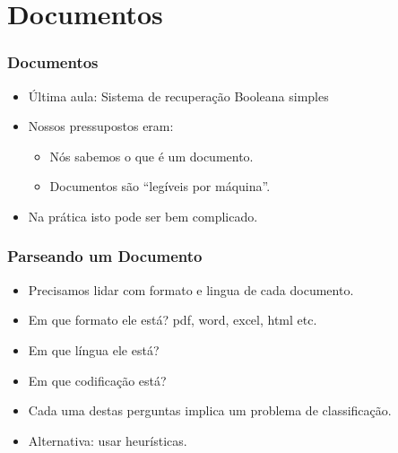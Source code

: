 \documentclass[compress]{beamer}
\begin{document}
\section{Documentos}
\begin{frame}
\frametitle{Documentos}
\begin{itemize}[<+->]
\item Última aula: Sistema de recuperação Booleana simples
\item Nossos pressupostos eram:
\begin{itemize}[<+->]
\item Nós sabemos o que é um documento.
\item Documentos são ``legíveis por máquina''.
\end{itemize}
\item Na prática isto pode ser bem complicado.
\end{itemize}
\end{frame}

\begin{frame}
\frametitle{Parseando um Documento}
\begin{itemize}[<+->]
\item Precisamos lidar com formato e lingua de cada documento.
\item Em que formato ele está? pdf, word, excel, html etc.
\item Em que língua ele está?
\item Em que codificação está?
\item Cada uma destas perguntas implica um problema de 
classificação.
\item Alternativa: usar heurísticas.
\end{itemize}
\end{frame}
\end{document}
